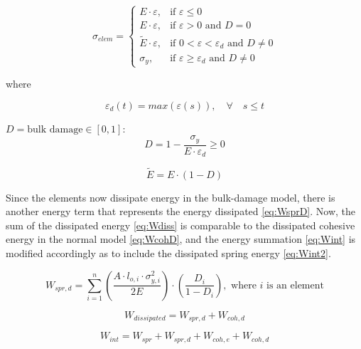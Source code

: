 \documentclass[12pt,a4paper]{article}
\begin{document}
\begin{equation}
\sigma_{elem} = \begin{cases} E \cdot \varepsilon, & \mbox{if } \varepsilon \leq 0 \\ E \cdot \varepsilon, & \mbox{if } \varepsilon > 0 \mbox{ and } D = 0 \\ \tilde{E} \cdot \varepsilon, & \mbox{if } 0 < \varepsilon < \varepsilon_{d} \mbox{ and } D \neq 0\\ \sigma_{y}, & \mbox{if } \varepsilon \geq \varepsilon_{d}\mbox{ and } D \neq 0 \end{cases}
\label{eq:zoneSprStress}
\end{equation}

where

\begin{equation}
\varepsilon_{d}(t) = max(\varepsilon(s)), \quad \forall \quad s \leq t
\label{eq:strainBulkDamage}
\end{equation}

$D = \mbox{bulk damage} \in [0,1]$:
\begin{equation}
D = 1 - \frac{\sigma_{y}}{E \cdot \varepsilon_{d}} \geq 0
\label{eq:bulkDamage}
\end{equation}

\begin{equation}
\tilde{E} = E \cdot (1 - D)
\label{eq:E_tilde}
\end{equation}

Since the elements now dissipate energy in the bulk-damage model, there is another energy term that represents the energy dissipated \eqref{eq:WsprD}. Now, the sum of the dissipated energy \eqref{eq:Wdiss} is comparable to the dissipated cohesive energy in the normal model \eqref{eq:WcohD}, and the energy summation \eqref{eq:Wint} is modified accordingly as to include the dissipated spring energy \eqref{eq:Wint2}.

\begin{equation}
W_{spr, d} = \sum_{i=1}^{n} (\frac{A \cdot l_{o, i} \cdot \sigma_{y, i}^{2}}{2E}) \cdot (\frac{D_{i}}{1 - D_{i}}),  \mbox{ where $i$ is an element}
\label{eq:WsprD}
\end{equation}

\begin{equation}
W_{dissipated} = W_{spr, d} + W_{coh, d}
\label{eq:Wdiss}
\end{equation}

\begin{equation}
W_{int} = W_{spr} + W_{spr, d} + W_{coh, e} + W_{coh, d}
\label{eq:Wint2}
\end{equation}\\
\end{document}
